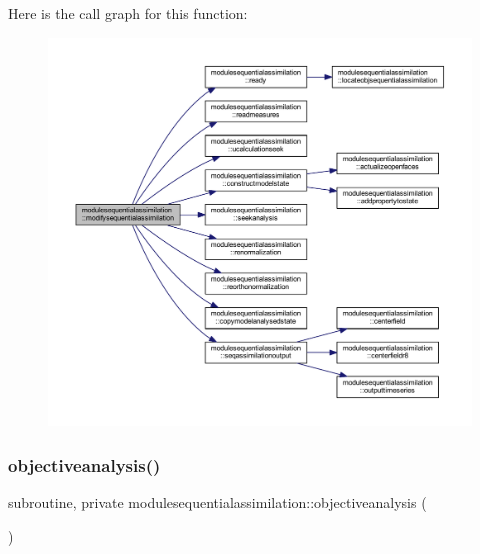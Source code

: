 Here is the call graph for this function\+:\nopagebreak
\begin{figure}[H]
\begin{center}
\leavevmode
\includegraphics[width=350pt]{namespacemodulesequentialassimilation_a4b01359595340ca852b276b1258601df_cgraph}
\end{center}
\end{figure}
\mbox{\label{namespacemodulesequentialassimilation_a09e6002fa92db2aafb977540ff4479fb}} 
\subsubsection{\texorpdfstring{objectiveanalysis()}{objectiveanalysis()}}
{\footnotesize\ttfamily subroutine, private modulesequentialassimilation\+::objectiveanalysis (\begin{DoxyParamCaption}{ }\end{DoxyParamCaption})\hspace{0.3cm}{\ttfamily [private]}}

